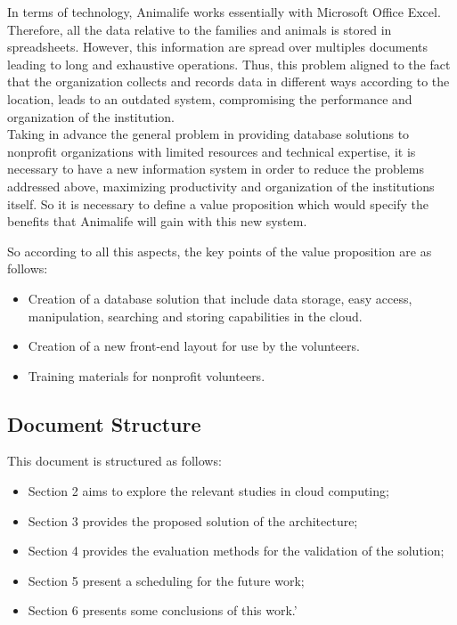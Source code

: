 In terms of technology, Animalife works essentially with Microsoft Office Excel. Therefore, all the data relative to the families and animals is stored in spreadsheets. However, this information are spread over multiples documents leading to long and exhaustive operations. Thus, this problem aligned to the fact that the organization collects and records data in different ways according to the location, leads to an outdated system, compromising the performance and organization of the institution.\\

Taking in advance the general problem in providing database solutions to nonprofit organizations with limited resources and technical expertise, it is necessary to have a new information system in order to reduce the problems addressed above, maximizing productivity and organization of the institutions itself. So it is necessary to define a value proposition which would specify the benefits that Animalife will gain with this new system.

So according to all this aspects, the key points of the value proposition are as follows:
\begin{itemize}
\item Creation of a database solution that include data storage, easy access, manipulation, searching and storing capabilities in the cloud.
\item Creation of a new front-end layout for use by the volunteers.
\item Training materials for nonprofit volunteers.
\end{itemize}


\subsection{Document Structure}\label{sec:related}

This document is structured as follows:
\begin{itemize}
\item Section 2 aims to explore the relevant studies in cloud computing;
\item Section 3 provides the proposed solution of the architecture;
\item Section 4 provides the evaluation methods for the validation of the solution;   
\item Section 5 present a scheduling for the future work;
\item Section 6 presents some conclusions of this work.'
\end{itemize}
